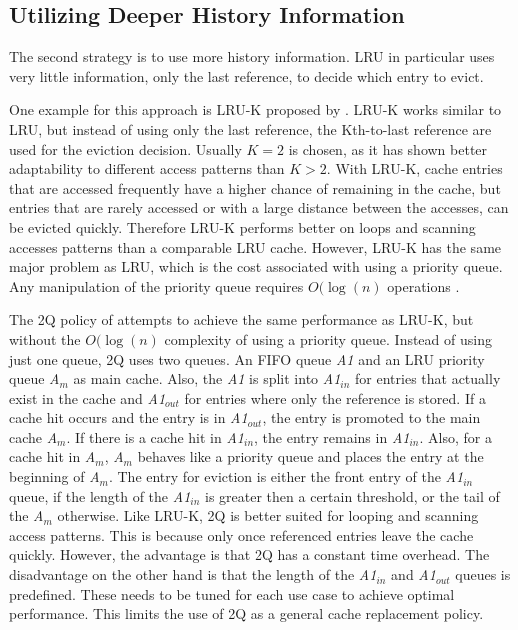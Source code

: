 \documentclass[
	12pt,
	a4paper,
	abstract,
	bibliography=totoc,
	chapterprefix,
	headings=openright,
	numbers=endperiod,
	parskip=half,
	twoside,
]{scrreprt}
\begin{document}
\subsection{Utilizing Deeper History Information}

The second strategy is to use more history information.
LRU in particular uses very little information, only the last reference, to decide which entry to evict.

One example for this approach is LRU-K proposed by \cite{o1993lru}.
LRU-K works similar to LRU, but instead of using only the last reference,
the Kth-to-last reference are used for the eviction decision. 
Usually $K = 2$ is chosen, as it has shown better adaptability to different access patterns than $K > 2$.
With LRU-K, cache entries that are accessed frequently have a higher chance of remaining in the cache, but 
entries that are rarely accessed or with a large distance between the accesses, can be evicted quickly.
Therefore LRU-K performs better on loops and scanning accesses patterns than a comparable LRU cache. 
However, LRU-K has the same major problem as LRU, which is the cost associated with using a priority queue.
Any manipulation of the priority queue requires $O(\log(n)$ operations \cite{10.1145/511399.511340}.

The 2Q policy of \cite{shasha19942q} attempts to achieve the same performance as LRU-K, but without the $O(\log(n)$ complexity of using a priority queue.
Instead of using just one queue, 2Q uses two queues.
An FIFO queue \emph{A1} and an LRU priority queue \emph{A$_m$} as main cache.
Also, the \emph{A1} is split into \emph{A1$_{in}$} for entries that actually exist in the cache and \emph{A1$_{out}$} for entries where only the reference is stored.
If a cache hit occurs and the entry is in \emph{A1$_{out}$}, the entry is promoted to the main cache \emph{A$_m$}.
If there is a cache hit in \emph{A1$_{in}$}, the entry remains in \emph{A1$_{in}$}.
Also, for a cache hit in \emph{A$_m$}, \emph{A$_m$} behaves like a priority queue and places the entry at the beginning of \emph{A$_m$}.
The entry for eviction is either the front entry of the \emph{A1$_{in}$} queue, if the length of the \emph{A1$_{in}$} is greater then a certain threshold, or the tail of the 
\emph{A$_m$} otherwise.
Like LRU-K, 2Q is better suited for looping and scanning access patterns.
This is because only once referenced entries leave the cache quickly.
However, the advantage is that 2Q has a constant time overhead.
The disadvantage on the other hand is that the 
length of the \emph{A1$_{in}$} and \emph{A1$_{out}$} queues is predefined.
These needs to be tuned for each use case to achieve optimal performance.
This limits the use of 2Q as a general cache replacement policy.
\end{document}
